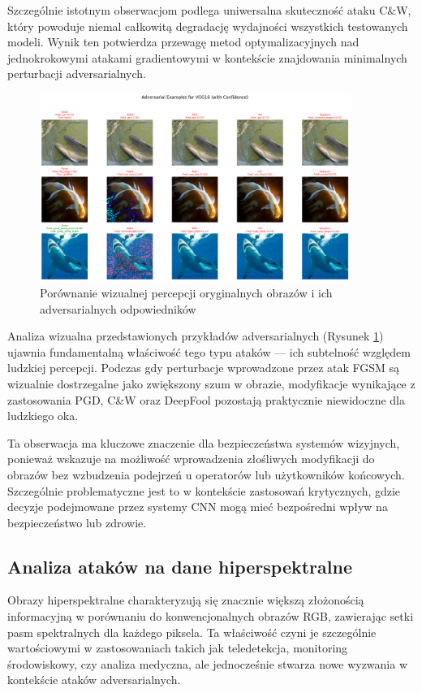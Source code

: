\documentclass[12pt]{article}
\begin{document}
Szczególnie istotnym obserwacjom podlega uniwersalna skuteczność ataku C\&W, który powoduje niemal całkowitą degradację wydajności wszystkich testowanych modeli. Wynik ten potwierdza przewagę metod optymalizacyjnych nad jednokrokowymi atakami gradientowymi w kontekście znajdowania minimalnych perturbacji adversarialnych.

\begin{figure}[H]
    \centering
    \includegraphics[width=0.9\textwidth]{adversarial_examples.png}
    \caption{Porównanie wizualnej percepcji oryginalnych obrazów i ich adversarialnych odpowiedników}
    \label{fig:adversarial-examples}
\end{figure}

Analiza wizualna przedstawionych przykładów adversarialnych (Rysunek \ref{fig:adversarial-examples}) ujawnia fundamentalną właściwość tego typu ataków --- ich subtelność względem ludzkiej percepcji. Podczas gdy perturbacje wprowadzone przez atak FGSM są wizualnie dostrzegalne jako zwiększony szum w obrazie, modyfikacje wynikające z zastosowania PGD, C\&W oraz DeepFool pozostają praktycznie niewidoczne dla ludzkiego oka.

Ta obserwacja ma kluczowe znaczenie dla bezpieczeństwa systemów wizyjnych, ponieważ wskazuje na możliwość wprowadzenia złośliwych modyfikacji do obrazów bez wzbudzenia podejrzeń u operatorów lub użytkowników końcowych. Szczególnie problematyczne jest to w kontekście zastosowań krytycznych, gdzie decyzje podejmowane przez systemy CNN mogą mieć bezpośredni wpływ na bezpieczeństwo lub zdrowie.
\subsection{Analiza ataków na dane hiperspektralne}

Obrazy hiperspektralne charakteryzują się znacznie większą złożonością informacyjną w porównaniu do konwencjonalnych obrazów RGB, zawierając setki pasm spektralnych dla każdego piksela. Ta właściwość czyni je szczególnie wartościowymi w zastosowaniach takich jak teledetekcja, monitoring środowiskowy, czy analiza medyczna, ale jednocześnie stwarza nowe wyzwania w kontekście ataków adversarialnych.
\end{document}
